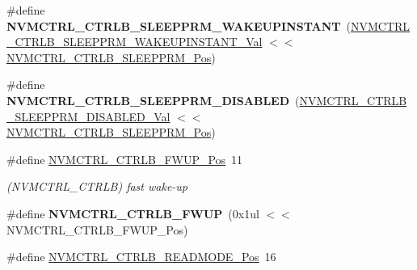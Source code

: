 \begin{DoxyCompactItemize}
\item 
\hypertarget{group___s_a_m_l21___n_v_m_c_t_r_l_ga6c32d4daa17d08d810b673df9bf3a3bf}{}\#define {\bfseries N\+V\+M\+C\+T\+R\+L\+\_\+\+C\+T\+R\+L\+B\+\_\+\+S\+L\+E\+E\+P\+P\+R\+M\+\_\+\+W\+A\+K\+E\+U\+P\+I\+N\+S\+T\+A\+N\+T}~(\hyperlink{group___s_a_m_l21___n_v_m_c_t_r_l_ga45d3a8b31b16b2b1204de0b61e5c12fc}{N\+V\+M\+C\+T\+R\+L\+\_\+\+C\+T\+R\+L\+B\+\_\+\+S\+L\+E\+E\+P\+P\+R\+M\+\_\+\+W\+A\+K\+E\+U\+P\+I\+N\+S\+T\+A\+N\+T\+\_\+\+Val} $<$$<$ \hyperlink{group___s_a_m_l21___n_v_m_c_t_r_l_gac7d2e32d78d79b7a7b67e1f6aa1571df}{N\+V\+M\+C\+T\+R\+L\+\_\+\+C\+T\+R\+L\+B\+\_\+\+S\+L\+E\+E\+P\+P\+R\+M\+\_\+\+Pos})\label{group___s_a_m_l21___n_v_m_c_t_r_l_ga6c32d4daa17d08d810b673df9bf3a3bf}

\item 
\hypertarget{group___s_a_m_l21___n_v_m_c_t_r_l_gab612ef2163b9b3f3b243a5a58ebbada0}{}\#define {\bfseries N\+V\+M\+C\+T\+R\+L\+\_\+\+C\+T\+R\+L\+B\+\_\+\+S\+L\+E\+E\+P\+P\+R\+M\+\_\+\+D\+I\+S\+A\+B\+L\+E\+D}~(\hyperlink{group___s_a_m_l21___n_v_m_c_t_r_l_ga2a6e0082abe992f41fe1e646e0b6b52a}{N\+V\+M\+C\+T\+R\+L\+\_\+\+C\+T\+R\+L\+B\+\_\+\+S\+L\+E\+E\+P\+P\+R\+M\+\_\+\+D\+I\+S\+A\+B\+L\+E\+D\+\_\+\+Val} $<$$<$ \hyperlink{group___s_a_m_l21___n_v_m_c_t_r_l_gac7d2e32d78d79b7a7b67e1f6aa1571df}{N\+V\+M\+C\+T\+R\+L\+\_\+\+C\+T\+R\+L\+B\+\_\+\+S\+L\+E\+E\+P\+P\+R\+M\+\_\+\+Pos})\label{group___s_a_m_l21___n_v_m_c_t_r_l_gab612ef2163b9b3f3b243a5a58ebbada0}

\item 
\hypertarget{group___s_a_m_l21___n_v_m_c_t_r_l_ga09e3e0789af477faad47b14a7d1d3fee}{}\#define \hyperlink{group___s_a_m_l21___n_v_m_c_t_r_l_ga09e3e0789af477faad47b14a7d1d3fee}{N\+V\+M\+C\+T\+R\+L\+\_\+\+C\+T\+R\+L\+B\+\_\+\+F\+W\+U\+P\+\_\+\+Pos}~11\label{group___s_a_m_l21___n_v_m_c_t_r_l_ga09e3e0789af477faad47b14a7d1d3fee}

\begin{DoxyCompactList}\small\item\em (N\+V\+M\+C\+T\+R\+L\+\_\+\+C\+T\+R\+L\+B) fast wake-\/up \end{DoxyCompactList}\item 
\hypertarget{group___s_a_m_l21___n_v_m_c_t_r_l_gaa0534b940b13c670cb41d472effd39c6}{}\#define {\bfseries N\+V\+M\+C\+T\+R\+L\+\_\+\+C\+T\+R\+L\+B\+\_\+\+F\+W\+U\+P}~(0x1ul $<$$<$ N\+V\+M\+C\+T\+R\+L\+\_\+\+C\+T\+R\+L\+B\+\_\+\+F\+W\+U\+P\+\_\+\+Pos)\label{group___s_a_m_l21___n_v_m_c_t_r_l_gaa0534b940b13c670cb41d472effd39c6}

\item 
\hypertarget{group___s_a_m_l21___n_v_m_c_t_r_l_ga46b5014db97bf5ce4da54dce52d162f9}{}\#define \hyperlink{group___s_a_m_l21___n_v_m_c_t_r_l_ga46b5014db97bf5ce4da54dce52d162f9}{N\+V\+M\+C\+T\+R\+L\+\_\+\+C\+T\+R\+L\+B\+\_\+\+R\+E\+A\+D\+M\+O\+D\+E\+\_\+\+Pos}~16\label{group___s_a_m_l21___n_v_m_c_t_r_l_ga46b5014db97bf5ce4da54dce52d162f9}


\end{DoxyCompactItemize}
